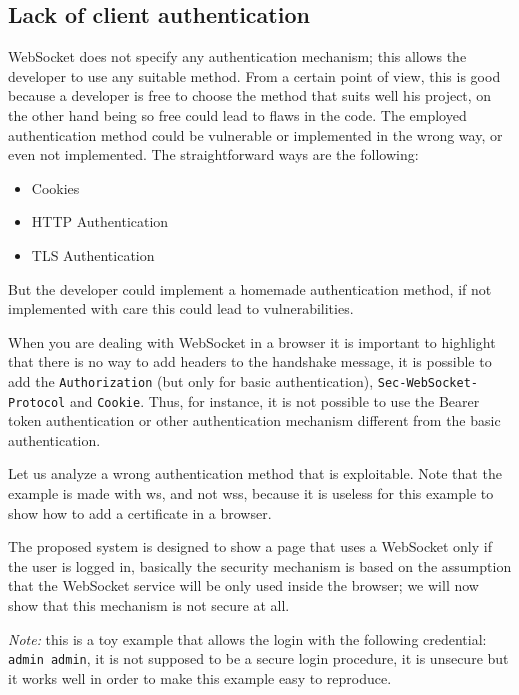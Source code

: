 	\subsection{Lack of client authentication}\label{sssec:lack}
	WebSocket does not specify any authentication mechanism; this allows the developer to use any suitable method.
	From a certain point of view, this is good because a developer is free to choose the method that suits well his project, on the other hand being so free could lead to flaws in the code.\newline
	The employed authentication method could be vulnerable or implemented in the wrong way, or even not implemented.\newline
	The straightforward ways are the following:
	\begin{itemize}
		\item Cookies
		\item HTTP Authentication
		\item TLS Authentication
	\end{itemize}

	But the developer could implement a homemade authentication method, if not implemented with care this could lead to vulnerabilities.\newline
	
	When you are dealing with WebSocket in a browser it is important to highlight that there is no way to add headers to the handshake message, it is possible to add the \texttt{Authorization} (but only for basic authentication), \texttt{Sec-WebSocket-Protocol} and \texttt{Cookie}.\newline
	Thus, for instance, it is not possible to use the Bearer token authentication or other authentication mechanism different from the basic authentication.\newline
	
	Let us analyze a wrong authentication method that is exploitable. Note that the example is made with ws, and not wss, because it is useless for this example to show how to add a certificate in a browser.\newline
	
	The proposed system is designed to show a page that uses a WebSocket only if the user is logged in, basically the security mechanism is based on the assumption that the WebSocket service will be only used inside the browser; we will now show that this mechanism is not secure at all.
	
	\emph{Note:} this is a toy example that allows the login with the following credential: \texttt{admin admin}, it is not supposed to be a secure login procedure, it is unsecure but it works well in order to make this example easy to reproduce.
	
